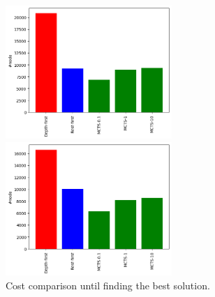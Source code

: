 \begin{figure}[htbp]
 \begin{minipage}{0.5\hsize}
  \begin{center}
   \includegraphics[width=63mm]{img/cas/artificial/1/node.png}
  \end{center}
 \end{minipage}
 \begin{minipage}{0.5\hsize}
  \begin{center}
   \includegraphics[width=63mm]{img/cas/artificial/2/node.png}
  \end{center}
 \end{minipage}
 \caption{Cost comparison until finding the best solution.}
  \label{fig:bestsearch}
\end{figure}

